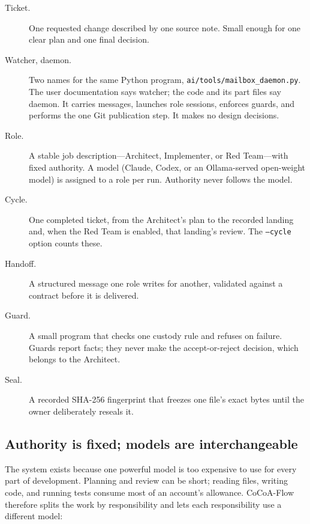 \documentclass[10pt,aps,prd,twocolumn,nofootinbib]{revtex4-2}
\newcommand{\code}[1]{\texttt{#1}}
\newcommand{\file}[1]{\texttt{#1}}
\begin{document}
\begin{description}
  \item[Ticket.]  One requested change described by one source note.
  Small enough for one clear plan and one final decision.

  \item[Watcher, daemon.]  Two names for the same Python program,
  \file{ai/tools/mailbox\_daemon.py}.  The user documentation says
  watcher; the code and its part files say daemon.  It carries
  messages, launches role sessions, enforces guards, and performs the
  one Git publication step.  It makes no design decisions.

  \item[Role.]  A stable job description---Architect, Implementer, or
  Red Team---with fixed authority.  A model (Claude, Codex, or an
  Ollama-served open-weight model) is assigned to a role per run.
  Authority never follows the model.

  \item[Cycle.]  One completed ticket, from the Architect's plan to the
  recorded landing and, when the Red Team is enabled, that landing's
  review.  The \code{--cycle} option counts these.

  \item[Handoff.]  A structured message one role writes for another,
  validated against a contract before it is delivered.

  \item[Guard.]  A small program that checks one custody rule and
  refuses on failure.  Guards report facts; they never make the
  accept-or-reject decision, which belongs to the Architect.

  \item[Seal.]  A recorded SHA-256 fingerprint that freezes one file's
  exact bytes until the owner deliberately reseals it.
\end{description}

\subsection{Authority is fixed; models are interchangeable}
\label{sec:roles}

The system exists because one powerful model is too expensive to use
for every part of development.  Planning and review can be short;
reading files, writing code, and running tests consume most of an
account's allowance.  CoCoA-Flow therefore splits the work by
responsibility and lets each responsibility use a different model:
\end{document}
